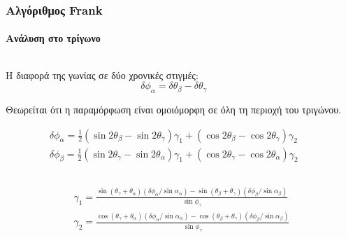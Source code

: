 \begin{frame}
  \frametitle{Αλγόριθμος Frank}
  \framesubtitle{Ανάλυση στο τρίγωνο}
  \label{fr3:frank_tr}
  \begin{columns}
    \begin{column}{.65\textwidth}
      Η διαφορά της γωνίας σε δύο χρονικές στιγμές:
      \[ \delta\phi_\alpha=\delta \theta_\beta - \delta \theta_\gamma \]
      
      Θεωρείται ότι η παραμόρφωση είναι ομοιόμορφη σε όλη τη περιοχή του τριγώνου.
      \begin{scriptsize}
      \begin{align*}
\delta\phi_\alpha = \frac{1}{2}\left ( \sin2\theta_\beta - \sin2\theta_\gamma \right )\gamma_1 + \left ( \cos2\theta_\beta - \cos2\theta_\gamma \right )\gamma_2 \\
\delta\phi_\beta = \frac{1}{2}\left ( \sin2\theta_\gamma - \sin2\theta_\alpha \right )\gamma_1 + \left ( \cos2\theta_\gamma -\cos2\theta_\alpha \right )\gamma_2
\end{align*}
      \end{scriptsize}

    \end{column}
    \begin{column}{.34\textwidth}
      \centering
          
          {\tiny \parencite{Frank1966}}
    \end{column}
  \end{columns}

  \begin{footnotesize}
  \begin{align*}
  \gamma_1=\frac{\sin\left ( \theta_\gamma + \theta_\alpha \right )\left ( \delta\phi_\alpha/\sin\alpha_\alpha \right ) - \sin\left ( \theta_\beta + \theta_\gamma \right )\left ( \delta\phi_\beta/\sin\alpha_\beta \right )}{\sin\phi_\gamma} \\
  \gamma_2=\frac{\cos\left ( \theta_\gamma + \theta_\alpha \right )\left ( \delta\phi_\alpha/\sin\alpha_\alpha \right ) - \cos\left ( \theta_\beta + \theta_\gamma \right )\left ( \delta\phi_\beta/\sin\alpha_\beta \right )}{\sin\phi_\gamma}
  \end{align*}
  \end{footnotesize}

\end{frame}
\note{}



